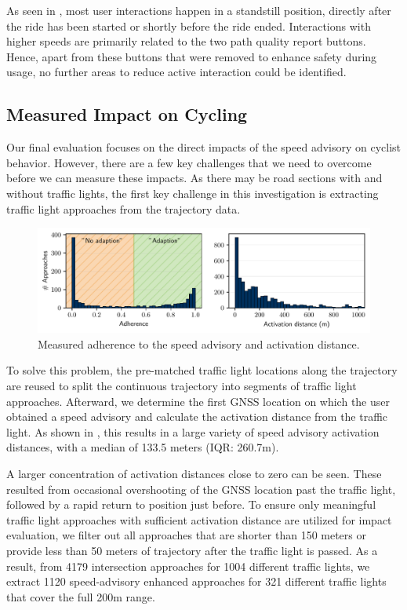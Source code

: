 As seen in , most user interactions happen in a standstill position, directly after the ride has been started or shortly before the ride ended. Interactions with higher speeds are primarily related to the two path quality report buttons. Hence, apart from these buttons that were removed to enhance safety during usage, no further areas to reduce active interaction could be identified.

\subsection{Measured Impact on Cycling}

Our final evaluation focuses on the direct impacts of the speed advisory on cyclist behavior. However, there are a few key challenges that we need to overcome before we can measure these impacts. As there may be road sections with and without traffic lights, the first key challenge in this investigation is extracting traffic light approaches from the trajectory data. 

\begin{figure}[t]
\caption{Measured adherence to the speed advisory and activation distance.}\label{fig:impacts-adherence-activation-distance}
\includegraphics[width=\linewidth]{images/impacts-adherence-activation-distance.pdf}
\end{figure}

To solve this problem, the pre-matched traffic light locations along the trajectory are reused to split the continuous trajectory into segments of traffic light approaches. Afterward, we determine the first GNSS location on which the user obtained a speed advisory and calculate the activation distance from the traffic light. As shown in , this results in a large variety of speed advisory activation distances, with a median of 133.5 meters (IQR: 260.7m). 

A larger concentration of activation distances close to zero can be seen. These resulted from occasional overshooting of the GNSS location past the traffic light, followed by a rapid return to position just before. To ensure only meaningful traffic light approaches with sufficient activation distance are utilized for impact evaluation, we filter out all approaches that are shorter than 150 meters or provide less than 50 meters of trajectory after the traffic light is passed. As a result, from 4179 intersection approaches for 1004 different traffic lights, we extract 1120 speed-advisory enhanced approaches for 321 different traffic lights that cover the full 200m range.

